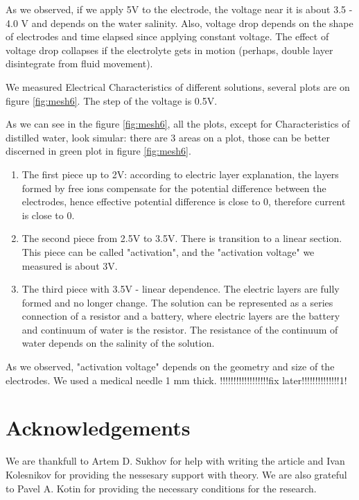 \documentclass{article}
\begin{document}
As we observed, if we apply 5V to the electrode, the voltage near it is about 3.5 - 4.0 V and depends on the water salinity. Also, voltage drop depends on the shape of electrodes and time elapsed since applying constant voltage. The effect of voltage drop collapses if the electrolyte gets in motion (perhaps, double layer disintegrate from fluid movement).

\par

We measured Electrical Characteristics of different solutions, several plots are on figure \ref{fig:mesh6}. The step of the voltage is 0.5V.

As we can see in the figure \ref{fig:mesh6}, all the plots, except for Characteristics of distilled water, look simular: there are 3 areas on a plot, those can be better discerned in green plot in figure \ref{fig:mesh6}. 

\begin{enumerate}
\item The first piece up to 2V: according to electric layer explanation, the layers formed by free ions compensate for the potential difference between the electrodes, hence effective potential difference is close to 0, therefore current is close to 0.

\item The second piece from 2.5V to 3.5V. There is transition to a linear section. This piece can be called "activation", and the "activation voltage" we measured is about 3V.

\item The third piece with 3.5V - linear dependence. The electric layers are fully formed and no longer change. The solution can be represented as a series connection of a resistor and a battery, where electric layers are the battery and continuum of water is the resistor. The resistance of the continuum of water depends on the salinity of the solution.
\end{enumerate}

As we observed, "activation voltage" depends on the geometry and size of the electrodes. We used a medical needle 1 mm thick. !!!!!!!!!!!!!!!!!!fix later!!!!!!!!!!!!!!1!


\section{Acknowledgements}
We are thankfull to Artem D. Sukhov for help with writing the article and Ivan Kolesnikov for providing the nessesary support with theory. We are also grateful to Pavel A. Kotin for providing the necessary conditions for the research.
\end{document}
